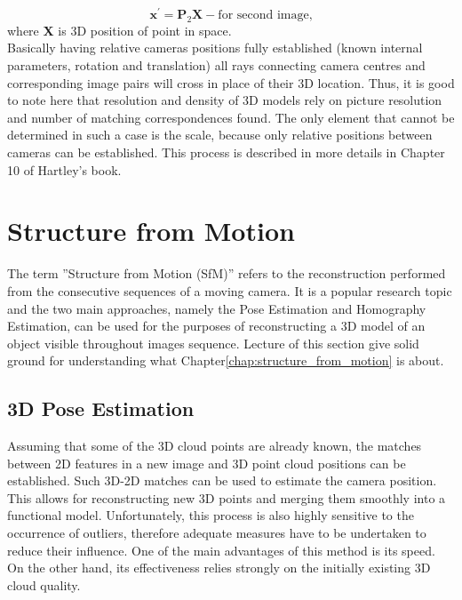 \begin{equation}
 \textbf{x}^{'} = \textbf{P}_{2} \textbf{X} - \text{for second image,}
\end{equation}
where \textbf{X} is 3D position of point in space.
\\
Basically having relative cameras positions fully established (known internal parameters, rotation and translation) all rays connecting camera centres and corresponding image pairs will cross in place of their 3D location. Thus, it is good to note here that resolution and density of 3D models rely on picture resolution and number of matching correspondences found. 
The only element that cannot be determined in such a case is the scale, because only relative positions between cameras can be established. This process is described in more details in Chapter 10 of Hartley's book\cite{HartleyMultipleView}.
\section{Structure from Motion}
The term ''Structure from Motion (SfM)'' refers to the reconstruction performed from the consecutive sequences of a moving camera. It is a popular research topic and the two main approaches, namely the Pose Estimation and Homography Estimation, can be used for the purposes of reconstructing a 3D model of an object visible throughout images sequence.
Lecture of this section give solid ground for understanding what Chapter\ref{chap:structure_from_motion} is about.
\subsection{3D Pose Estimation}
Assuming that some of the 3D cloud points are already known, the matches between 2D features in a new image and 3D point cloud positions can be established. Such 3D-2D matches can be used to estimate the camera position. This allows for reconstructing new 3D points and merging them smoothly into a functional model. Unfortunately,  this process is also highly sensitive to the occurrence of outliers, therefore adequate measures have to be undertaken to reduce their influence. One of the main advantages of this method is its speed. On the other hand, its effectiveness relies strongly on the initially existing 3D cloud quality. 
